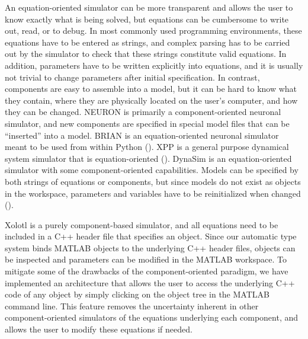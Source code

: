 \documentclass{frontiersSCNS} %
\begin{document}
An equation-oriented simulator can be more transparent and allows the user to know exactly what is being solved, but equations can be cumbersome to write out, read, or to debug. In most commonly used programming environments, these equations have to be entered as strings, and complex parsing has to be carried out by the simulator to check that these strings constitute valid equations. In addition, parameters have to be written explicitly into equations, and it is usually not trivial to change parameters after initial specification. In contrast, components are easy to assemble into a model, but it can be hard to know what they contain, where they are physically located on the user's computer, and how they can be changed. NEURON is primarily a component-oriented neuronal simulator, and new components are specified in special model files that can be ``inserted'' into a model. BRIAN is an equation-oriented neuronal simulator meant to be used from within Python (\cite{goodmanBrianSimulator2009}). XPP is a general purpose dynamical system simulator that is equation-oriented (\cite{ermentrout2002simulating}). DynaSim is an equation-oriented simulator with some component-oriented capabilities. Models can be specified by both strings of equations or components, but since models do not exist as objects in the workspace, parameters and variables have to be reinitialized when changed (\cite{sherfeyDynaSimMATLABToolbox2018}).

Xolotl is a purely component-based simulator, and all equations need to be included in a C++ header file that specifies an object. Since our automatic type system binds MATLAB objects to the underlying C++ header files, objects can be inspected and parameters can be modified in the MATLAB workspace. To mitigate some of the drawbacks of the component-oriented paradigm, we have implemented an architecture that allows the user to access the underlying C++ code of any object by simply clicking on the object tree in the MATLAB command line. This feature removes the uncertainty inherent in other component-oriented simulators of the equations underlying each component, and allows the user to modify these equations if needed.
\end{document}
